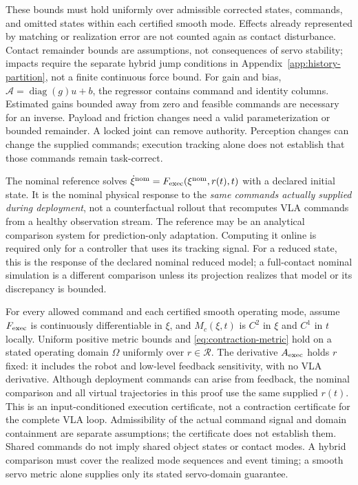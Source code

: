 These bounds must hold uniformly over admissible corrected states,
commands, and omitted states within each certified smooth mode. Effects
already represented by matching or realization error are not counted again
as contact disturbance. Contact remainder bounds are assumptions, not
consequences of servo stability; impacts require the separate hybrid jump
conditions in Appendix~\ref{app:history-partition}, not a finite continuous
force bound. For gain and bias,
$\mathcal A=\operatorname{diag}(g)u+b$, the regressor contains command
and identity columns. Estimated gains bounded away from zero and feasible
commands are necessary for an inverse. Payload and friction changes need
a valid parameterization or bounded remainder. A locked joint can remove
authority. Perception changes can change the supplied commands; execution
tracking alone does not establish that those commands remain task-correct.

The nominal reference solves
$\dot\xi^{\rm nom}=F_{\rm exec}(\xi^{\rm nom},r(t),t)$ with a declared initial state.
It is the nominal physical response to the \emph{same commands actually
supplied during deployment}, not a counterfactual rollout that recomputes
VLA commands from a healthy observation stream. The reference may be an
analytical comparison system for prediction-only adaptation. Computing it
online is required only for a controller that uses its tracking signal.
For a reduced state, this is the response of the declared nominal reduced
model; a full-contact nominal simulation is a different comparison unless
its projection realizes that model or its discrepancy is bounded.

For every allowed command and each certified smooth operating mode,
assume $F_{\rm exec}$ is continuously differentiable in $\xi$, and $M_c(\xi,t)$ is $C^2$ in $\xi$ and $C^1$
in $t$ locally. Uniform positive metric bounds and
\eqref{eq:contraction-metric} hold on a stated operating domain $\Omega$
uniformly over $r\in\mathcal R$. The derivative $A_{\rm exec}$ holds $r$
fixed: it includes the robot and low-level feedback sensitivity, with no
VLA derivative. Although deployment commands can arise from feedback,
the nominal comparison and all virtual trajectories in this proof use
the same supplied $r(t)$. This is an input-conditioned execution
certificate, not a contraction certificate for the complete VLA loop.
Admissibility of the actual command signal and domain containment are
separate assumptions; the certificate does not establish them. Shared
commands do not imply shared object states or contact modes. A hybrid
comparison must cover the realized mode sequences and event timing; a
smooth servo metric alone supplies only its stated servo-domain guarantee.

